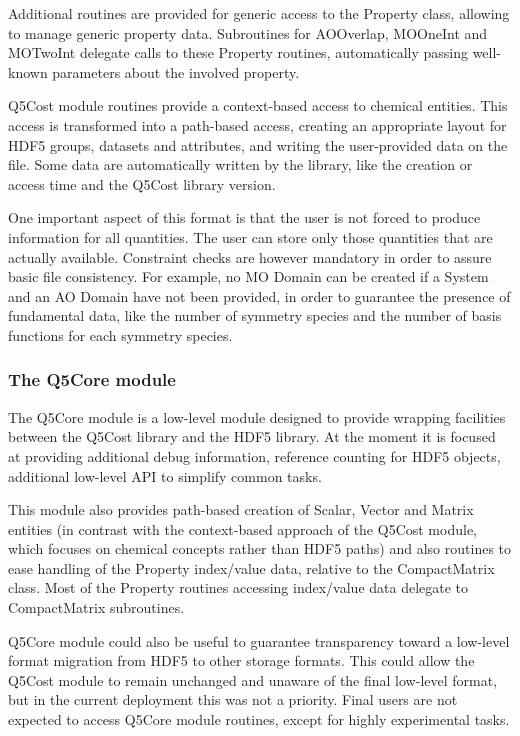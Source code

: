 Additional routines are provided for generic access to the Property
class, allowing to manage generic property data. Subroutines for
AOOverlap, MOOneInt and MOTwoInt delegate calls to these Property routines,
automatically passing well-known parameters about the involved property.

Q5Cost module routines provide a context-based access to chemical
entities. This access is transformed into a path-based access, creating
an appropriate layout for HDF5 groups, datasets and attributes, and
writing the user-provided data on the file. Some data are automatically
written by the library, like the creation or access time and the
Q5Cost library version. 

One important aspect of this format is that the user is not forced to
produce information for all quantities. The user can store only those
quantities that are actually available.  Constraint checks are however
mandatory in order to assure basic file consistency. For example, no MO
Domain can be created if a System and an AO Domain have not been provided,
in order to guarantee the presence of fundamental data, like the number of
symmetry species and the number of basis functions for each symmetry
species.

\subsubsection*{The Q5Core module}

The Q5Core module is a low-level module designed to provide wrapping
facilities between the Q5Cost library and the HDF5 library. At the moment it
is focused at providing additional debug information, reference counting
for HDF5 objects, additional low-level API to simplify common tasks.

This module also provides path-based creation of Scalar, Vector and
Matrix entities (in contrast with the context-based approach of the Q5Cost
module, which focuses on chemical concepts rather than HDF5 paths) and also
routines to ease handling of the Property index/value data, relative to the
CompactMatrix class. Most of the Property routines accessing index/value
data delegate to CompactMatrix subroutines. 

Q5Core module could also be useful to guarantee transparency toward a
low-level format migration from HDF5 to other storage formats. This could
allow the Q5Cost module to remain unchanged and unaware of the final
low-level format, but in the current deployment this was not a priority.
Final users are not expected to access Q5Core module routines, except for
highly experimental tasks.

